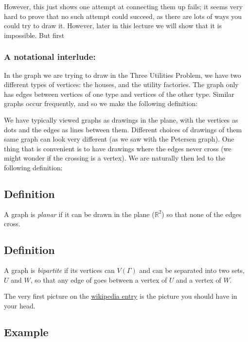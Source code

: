 \documentclass[]{article}
\begin{document}
However, this just shows one attempt at connecting them up fails; it
seems very hard to prove that no such attempt could succeed, as there
are lots of ways you could try to draw it. However, later in this
lecture we will show that it is impossible. But first

\subsubsection{A notational interlude:}\label{a-notational-interlude}

In the graph we are trying to draw in the Three Utilities Problem, we
have two different types of vertices: the houses, and the utility
factories. The graph only has edges between vertices of one type and
vertices of the other type. Similar graphs occur frequently, and so we
make the following definition:

We have typically viewed graphs as drawings in the plane, with the
vertices as dots and the edges as lines between them. Different choices
of drawings of them same graph can look very different (as we saw with
the Petersen graph). One thing that is convenient is to have drawings
where the edges never cross (we might wonder if the crossing is a
vertex). We are naturally then led to the following definition:

\subsection{Definition}\label{definition-10}

A graph is \emph{planar} if it can be drawn in the plane
(\(\mathbb{R}^2\)) so that none of the edges cross.

\subsection{Definition}\label{definition-11}

A graph is \emph{bipartite} if its vertices can \(V(\Gamma)\) and can be
separated into two sets, \(U\) and \(W\), so that any edge of goes
between a vertex of \(U\) and a vertex of \(W\).

The very first picture on the
\href{https://en.wikipedia.org/wiki/Bipartite_graph}{wikipedia entry} is
the picture you should have in your head.

\subsection{Example}\label{example-7}
\end{document}
